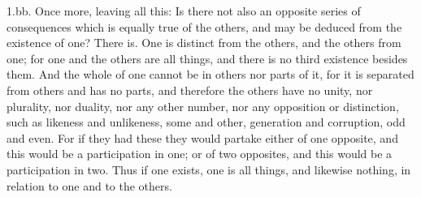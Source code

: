 \documentclass[11pt,letter]{article}
\begin{document}
\par  1.bb. Once more, leaving all this: Is there not also an opposite series of consequences which is equally true of the others, and may be deduced from the existence of one? There is. One is distinct from the others, and the others from one; for one and the others are all things, and there is no third existence besides them. And the whole of one cannot be in others nor parts of it, for it is separated from others and has no parts, and therefore the others have no unity, nor plurality, nor duality, nor any other number, nor any opposition or distinction, such as likeness and unlikeness, some and other, generation and corruption, odd and even. For if they had these they would partake either of one opposite, and this would be a participation in one; or of two opposites, and this would be a participation in two. Thus if one exists, one is all things, and likewise nothing, in relation to one and to the others.
\end{document}
